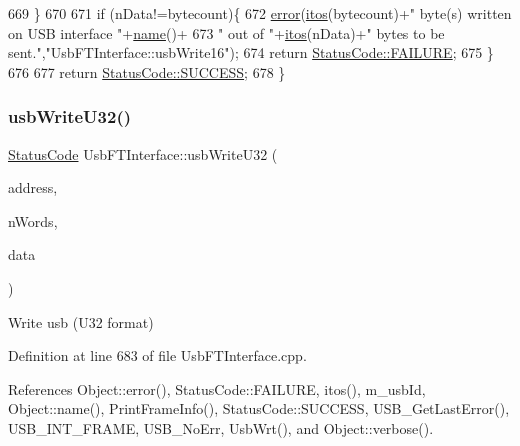 \begin{DoxyCode}
669   \}
670 
671   \textcolor{keywordflow}{if} (nData!=bytecount)\{
672     \hyperlink{classObject_a204a95f57818c0f811933917a30eff45}{error}(\hyperlink{Tools_8h_af330027dbdafb9a30768b3613c553e60}{itos}(bytecount)+\textcolor{stringliteral}{" byte(s) written on USB interface "}+\hyperlink{classObject_a300f4c05dd468c7bb8b3c968868443c1}{name}()+
673             \textcolor{stringliteral}{" out of "}+\hyperlink{Tools_8h_af330027dbdafb9a30768b3613c553e60}{itos}(nData)+\textcolor{stringliteral}{" bytes to be sent."},\textcolor{stringliteral}{"UsbFTInterface::usbWrite16"});
674     \textcolor{keywordflow}{return} \hyperlink{classStatusCode_a6f565cbeadc76d14c72f047e5e85eb4ba3da73d4c469762eb9d3c960368252b26}{StatusCode::FAILURE};    
675   \}
676 
677   \textcolor{keywordflow}{return} \hyperlink{classStatusCode_a6f565cbeadc76d14c72f047e5e85eb4badd0da38d3ba0d922efd1f4619bc37ad8}{StatusCode::SUCCESS};  
678 \}
\end{DoxyCode}
\mbox{\label{classUsbFTInterface_ac5eac42e444c9b0f19f0f70598c51b20}} 
\subsubsection{\texorpdfstring{usb\+Write\+U32()}{usbWriteU32()}}
{\footnotesize\ttfamily \hyperlink{classStatusCode}{Status\+Code} Usb\+F\+T\+Interface\+::usb\+Write\+U32 (\begin{DoxyParamCaption}\item[{unsigned long int}]{address,  }\item[{unsigned long int}]{n\+Words,  }\item[{unsigned long $\ast$}]{data }\end{DoxyParamCaption})}

Write usb (U32 format) 

Definition at line 683 of file Usb\+F\+T\+Interface.\+cpp.



References Object\+::error(), Status\+Code\+::\+F\+A\+I\+L\+U\+RE, itos(), m\+\_\+usb\+Id, Object\+::name(), Print\+Frame\+Info(), Status\+Code\+::\+S\+U\+C\+C\+E\+SS, U\+S\+B\+\_\+\+Get\+Last\+Error(), U\+S\+B\+\_\+\+I\+N\+T\+\_\+\+F\+R\+A\+ME, U\+S\+B\+\_\+\+No\+Err, Usb\+Wrt(), and Object\+::verbose().



